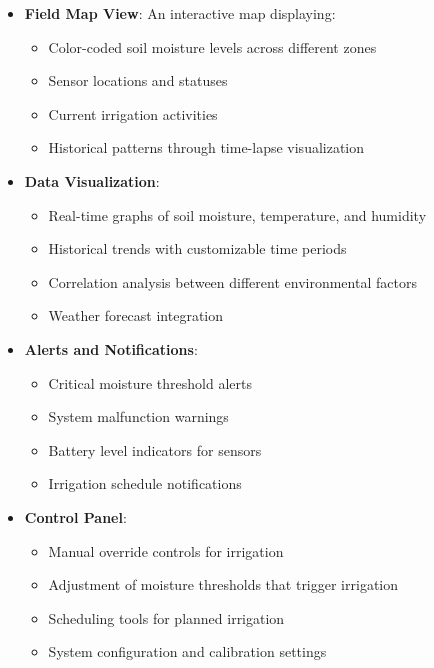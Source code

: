 \documentclass[12pt,a4paper]{article}
\begin{document}
\begin{itemize}
    \item \textbf{Field Map View}: An interactive map displaying:
    \begin{itemize}
        \item Color-coded soil moisture levels across different zones
        \item Sensor locations and statuses
        \item Current irrigation activities
        \item Historical patterns through time-lapse visualization
    \end{itemize}
    
    \item \textbf{Data Visualization}:
    \begin{itemize}
        \item Real-time graphs of soil moisture, temperature, and humidity
        \item Historical trends with customizable time periods
        \item Correlation analysis between different environmental factors
        \item Weather forecast integration
    \end{itemize}
    
    \item \textbf{Alerts and Notifications}:
    \begin{itemize}
        \item Critical moisture threshold alerts
        \item System malfunction warnings
        \item Battery level indicators for sensors
        \item Irrigation schedule notifications
    \end{itemize}
    
    \item \textbf{Control Panel}:
    \begin{itemize}
        \item Manual override controls for irrigation
        \item Adjustment of moisture thresholds that trigger irrigation
        \item Scheduling tools for planned irrigation
        \item System configuration and calibration settings
    \end{itemize}
\end{itemize}
\end{document}
